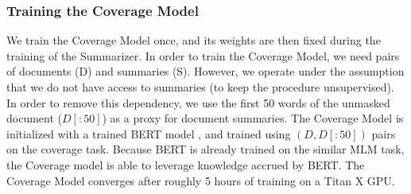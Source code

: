 \documentclass[11pt,a4paper]{article}
\begin{document}
\begin{table}[]
    \caption{Analysis of the raw and normalized coverage of three existing human-written summary datasets, as well as first-k word baselines.}
    \label{fig:coverage_analysis}
\end{table}

\subsubsection{Training the Coverage Model}
\label{section:coverage_pretraining}
We train the Coverage Model once, and its weights are then fixed during the training of the Summarizer.
In order to train the Coverage Model, we need pairs of documents (D) and summaries (S). However, we operate under the assumption that we do not have access to summaries (to keep the procedure unsupervised). In order to remove this dependency, we use the first 50 words  of the unmasked document ($D[:50]$) as a proxy for document summaries.
The Coverage Model is initialized with a trained BERT model \cite{devlin2019bert}, and trained using $(D, D[:50])$ pairs on the coverage task. Because BERT is already trained on the similar MLM task, the Coverage model is able to leverage knowledge accrued by BERT. The Coverage Model converges after roughly 5 hours of training on a Titan X GPU.
\end{document}
